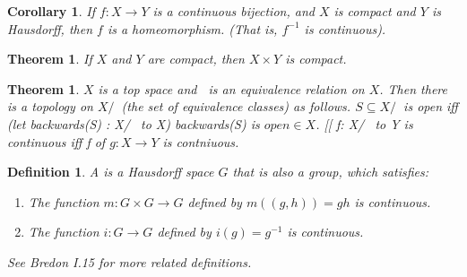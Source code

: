 \documentclass[11pt]{amsbook}
\theoremstyle{mystyle} \newtheorem{thrm}[thm]{Theorem}
\theoremstyle{mystyle} \newtheorem{defi}[thm]{Definition}
\theoremstyle{mystyle} \newtheorem{coro}[thm]{Corollary}
\theoremstyle{mystyle} \newtheorem{propo}[thm]{Proposition}
\theoremstyle{mystyle} \newtheorem{lemm}[thm]{Lemma}
\numberwithin{thm}{section}
\begin{document}
\begin{coro}
	If $f : X \to Y$ is a continuous bijection, and $X$ is compact and $Y$ is Hausdorff, then $f$ is a homeomorphism. (That is, $f^{-1}$ is continuous).
\end{coro}
\begin{thrm}
	If $X$ and $Y$ are compact, then $X \times Y$ is compact.
\end{thrm}
\begin{thrm}
	$X$ is a top space and $~$ is an equivalence relation on $X$.  Then there is a topology on $X/~$ (the set of equivalence classes) as follows.  $S \subseteq X/~$ is open iff (let backwards(S) : X/~ to X) backwards(S) is $open \in X$.  [[ f: X/~ to Y is continuous iff f of $g: X \to Y$ is contniuous.
\end{thrm}
\begin{defi}
	A  is a Hausdorff space $G$ that is also a group, which satisfies:
	\begin{enumerate}
		\item The function $m : G \times G \to G$ defined by $m((g,h)) = gh$ is continuous.
		\item The function $i : G \to G$ defined by $i(g) = g^{-1}$ is continuous.
	\end{enumerate}
	See Bredon I.15 for more related definitions.
\end{defi}
\end{document}
